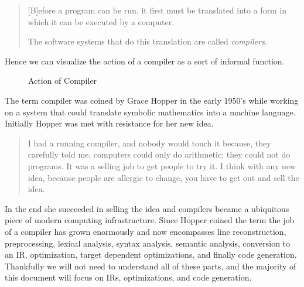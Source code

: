 \begin{quotation}
    [B]efore a program can be run, it first must be translated into a form in which it can be executed by a computer.

    The software systems that do this translation are called \emph{compilers}.
\end{quotation}
Hence we can visualize the action of a compiler as a sort of informal function.
\begin{figure}[ht]
    \centering
    \caption{Action of Compiler}\label{fig:compiler}
\end{figure}

The term compiler was coined by Grace Hopper in the early 1950's while working on a system that could translate symbolic mathematics into a machine language.
Initially Hopper was met with resistance for her new idea.
\begin{quotation}
    I had a running compiler, and nobody would touch it because, they carefully told me, computers could only do arithmetic; they could not do programs.
    It was a selling job to get people to try it.
    I think with any new idea, because people are allergic to change, you have to get out and sell the idea.
\end{quotation}
In the end she succeeded in selling the idea and compilers became a ubiquitous piece of modern computing infrastructure.
Since Hopper coined the term the job of a compiler has grown enormously and now encompasses line reconstruction, preprocessing, lexical analysis, syntax analysis, semantic analysis, conversion to an \ac{IR}, optimization, target dependent optimizations, and finally code generation.
Thankfully we will not need to understand all of these parts, and the majority of this document will focus on \aclp{IR}, optimizations, and code generation.

